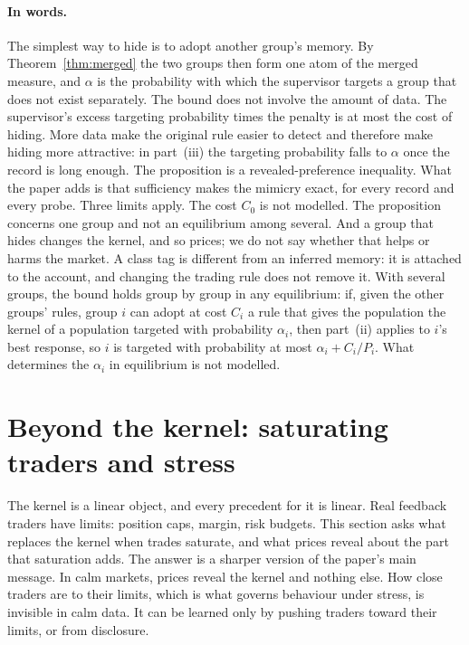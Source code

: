 \documentclass[12pt]{article}
\theoremstyle{definition}
\theoremstyle{remark}
\begin{document}
\paragraph{In words.} The simplest way to hide is to adopt another group's memory. By Theorem~\ref{thm:merged} the two groups then form one atom of the merged measure, and $\alpha$ is the probability with which the supervisor targets a group that does not exist separately. The bound does not involve the amount of data. The supervisor's excess targeting probability times the penalty is at most the cost of hiding. More data make the original rule easier to detect and therefore make hiding more attractive: in part~(iii) the targeting probability falls to $\alpha$ once the record is long enough. The proposition is a revealed-preference inequality. What the paper adds is that sufficiency makes the mimicry exact, for every record and every probe. Three limits apply. The cost $C_0$ is not modelled. The proposition concerns one group and not an equilibrium among several. And a group that hides changes the kernel, and so prices; we do not say whether that helps or harms the market. A class tag is different from an inferred memory: it is attached to the account, and changing the trading rule does not remove it. With several groups, the bound holds group by group in any equilibrium: if, given the other groups' rules, group $i$ can adopt at cost $C_i$ a rule that gives the population the kernel of a population targeted with probability $\alpha_i$, then part~(ii) applies to $i$'s best response, so $i$ is targeted with probability at most $\alpha_i+C_i/P_i$. What determines the $\alpha_i$ in equilibrium is not modelled.


\section{Beyond the kernel: saturating traders and stress}\label{sec:saturating}

The kernel is a linear object, and every precedent for it is linear. Real feedback traders have limits: position caps, margin, risk budgets. This section asks what replaces the kernel when trades saturate, and what prices reveal about the part that saturation adds. The answer is a sharper version of the paper's main message. In calm markets, prices reveal the kernel and nothing else. How close traders are to their limits, which is what governs behaviour under stress, is invisible in calm data. It can be learned only by pushing traders toward their limits, or from disclosure.
\end{document}

